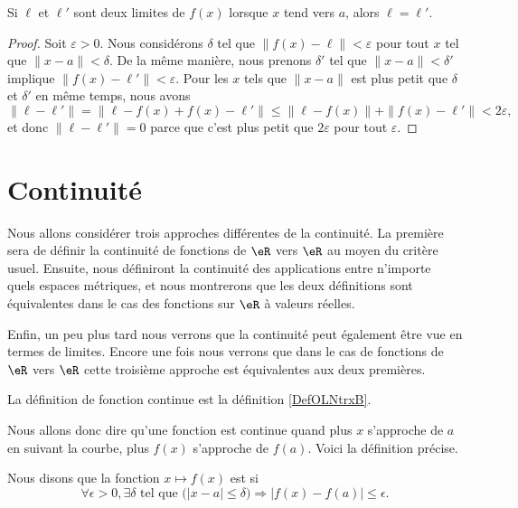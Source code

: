 \begin{lemma}
	Si $\ell$ et $\ell'$ sont deux limites de $f(x)$ lorsque $x$ tend vers $a$, alors $\ell=\ell'$.
\end{lemma}

\begin{proof}
	Soit $\varepsilon>0$. Nous considérons $\delta$ tel que $\| f(x)-\ell \|<\varepsilon$ pour tout $x$ tel que $\| x-a \|<\delta$. De la même manière, nous prenons $\delta'$ tel que $\| x-a \|<\delta'$ implique $\| f(x)-\ell' \|<\varepsilon$. Pour les $x$ tels que $\| x-a \|$ est plus petit que $\delta$ et $\delta'$ en même temps, nous avons
	\begin{equation}
		\| \ell-\ell' \|=\| \ell-f(x)+f(x)-\ell' \|\leq\| \ell-f(x) \|+\| f(x)-\ell' \|<2\varepsilon,
	\end{equation}
	et donc $\| \ell-\ell' \|=0$ parce que c'est plus petit que $2\varepsilon$ pour tout $\varepsilon$.
\end{proof}

\section{Continuité}

Nous allons considérer trois approches différentes de la continuité. La première sera de définir la continuité de fonctions de $\eR$ vers $\eR$ au moyen du critère usuel. Ensuite, nous définiront la continuité des applications entre n'importe quels espaces métriques, et nous montrerons que les deux définitions sont équivalentes dans le cas des fonctions sur $\eR$ à valeurs réelles.

Enfin, un peu plus tard nous verrons que la continuité peut également être vue en termes de limites. Encore une fois nous verrons que dans le cas de fonctions de $\eR$ vers $\eR$ cette troisième approche est équivalentes aux deux premières.

La définition de fonction continue est la définition \ref{DefOLNtrxB}.

Nous allons donc dire qu'une fonction est continue quand plus $x$ s'approche de $a$ en suivant la courbe, plus $f(x)$ s'approche de $f(a)$. Voici la définition précise.
\begin{definition}      \label{DefContinue}
Nous disons que la fonction $x\mapsto f(x)$ est  si
\begin{equation}
 \forall \epsilon>0,\exists \delta\text{ tel que } \big(| x-a |\leq\delta\big)\Rightarrow | f(x)-f(a) |\leq \epsilon.
\end{equation}
\end{definition}


